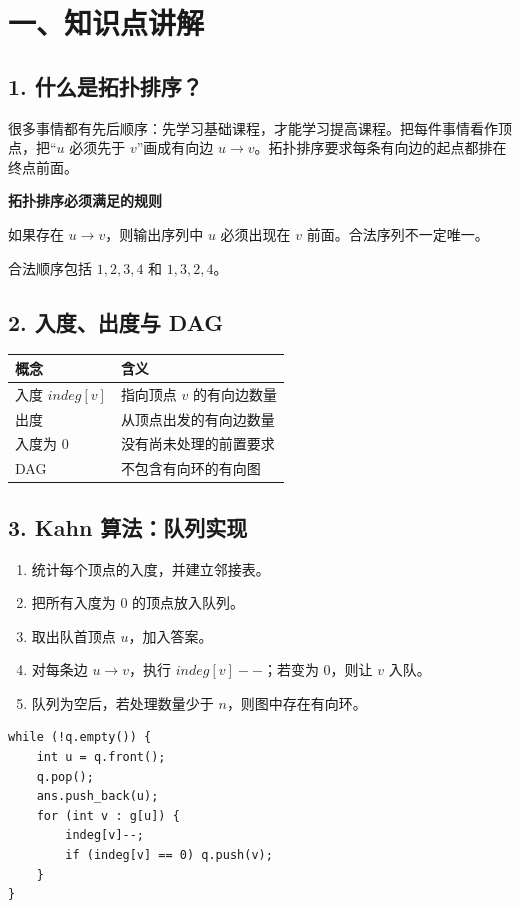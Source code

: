 \documentclass[UTF8,10.9pt]{ctexart}
\begin{document}
\section{一、知识点讲解}
\subsection{1. 什么是拓扑排序？}
很多事情都有先后顺序：先学习基础课程，才能学习提高课程。把每件事情看作顶点，把“$u$ 必须先于 $v$”画成有向边 $u\to v$。拓扑排序要求每条有向边的起点都排在终点前面。
\begin{lessonhint}
\textbf{拓扑排序必须满足的规则}\par
如果存在 $u\to v$，则输出序列中 $u$ 必须出现在 $v$ 前面。合法序列不一定唯一。
\end{lessonhint}
\begin{center}
\end{center}
\noindent 合法顺序包括 $1,2,3,4$ 和 $1,3,2,4$。
\subsection{2. 入度、出度与 DAG}
\begin{center}
\begin{tabularx}{.96\linewidth}{@{}lX@{}}\toprule
概念 & 含义\\\midrule
入度 $indeg[v]$ & 指向顶点 $v$ 的有向边数量\\
出度 & 从顶点出发的有向边数量\\
入度为 0 & 没有尚未处理的前置要求\\
DAG & 不包含有向环的有向图\\\bottomrule
\end{tabularx}
\end{center}
\subsection{3. Kahn 算法：队列实现}
\begin{enumerate}
\item 统计每个顶点的入度，并建立邻接表。
\item 把所有入度为 0 的顶点放入队列。
\item 取出队首顶点 $u$，加入答案。
\item 对每条边 $u\to v$，执行 $indeg[v]--$；若变为 0，则让 $v$ 入队。
\item 队列为空后，若处理数量少于 $n$，则图中存在有向环。
\end{enumerate}
\begin{lstlisting}[style=lessonfragment]
while (!q.empty()) {
    int u = q.front();
    q.pop();
    ans.push_back(u);
    for (int v : g[u]) {
        indeg[v]--;
        if (indeg[v] == 0) q.push(v);
    }
}
\end{lstlisting}
\end{document}
